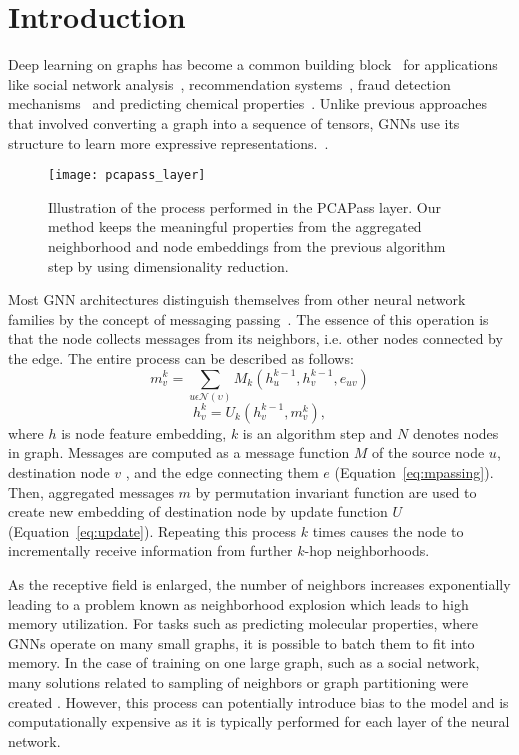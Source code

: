\documentclass[nohyperref]{article}
\theoremstyle{plain}
\theoremstyle{definition}
\theoremstyle{remark}
\begin{document}
\section{Introduction}
Deep learning on graphs has become a common building block~\cite{zhang2020deep,gnnsurvey2021} for applications like social network analysis~\cite{li2021relevanceaware}, recommendation systems~\cite{gao2021graph}, fraud detection mechanisms~\cite{wang2021review} and predicting chemical properties~\cite{li2021graph}. 
Unlike previous approaches that involved converting a graph into a sequence of tensors, GNNs use its structure to learn more expressive representations.~\cite{hamilton2018representation,zhou2021graph}.
\begin{figure}[H]
    \vskip 0.2in
    \begin{center}
    \centerline{\texttt{[image: pcapass\_layer]}}
    \caption{Illustration of the process performed in the PCAPass layer. Our method keeps the meaningful properties from the aggregated neighborhood and node embeddings from the previous algorithm step by using dimensionality reduction.}
    \label{fig:pcapass_schema1}
    \end{center}
    \vskip -0.2in
\end{figure}
Most GNN architectures distinguish themselves from other neural network families by the concept of messaging passing~\cite{gilmer2017neural}. 
The essence of this operation is that the node collects messages from its neighbors, i.e. other nodes connected by the edge. 
The entire process can be described as follows:
\begin{equation}
m^{k}_v = \sum_{u\epsilon\mathcal{N(\upsilon)}} M_k(h^{k-1}_u,h^{k-1}_v,e_{uv})
\label{eq:mpassing}
\end{equation}
\begin{equation}
h^{k}_v = U_k(h^{k-1}_v,m^{k}_v),
\label{eq:update}
\end{equation}
where $h$ is node feature embedding, $k$ is an algorithm step and $N$ denotes nodes in graph. 
Messages are computed as a message function $M$ of the source node $u$, destination node $v$ , and the edge connecting them $e$ (Equation~\ref{eq:mpassing}). 
Then, aggregated messages $m$ by permutation invariant function are used to create new embedding of destination node by update function $U$ (Equation~\ref{eq:update}). 
Repeating this process $k$ times causes the node to incrementally receive information from further $k$-hop neighborhoods.

As the receptive field is enlarged, the number of neighbors increases exponentially leading to a problem known as neighborhood explosion which leads to high memory utilization. 
For tasks such as predicting molecular properties, where GNNs operate on many small graphs, it is possible to batch them to fit into memory. 
In the case of training on one large graph, such as a social network, many solutions related to sampling of neighbors or graph partitioning were created \cite{pingsage2018,cluster2019,hamilton2018representation}. 
However, this process can potentially introduce bias to the model and is computationally expensive as it is typically performed for each layer of the neural network.
\end{document}
